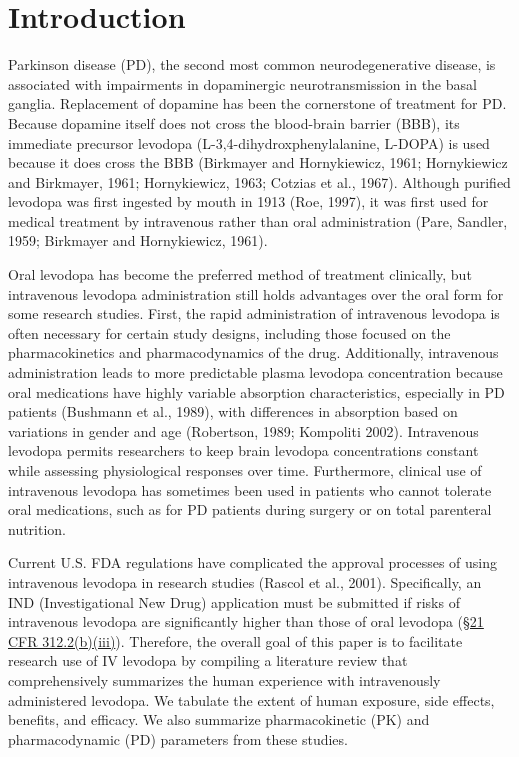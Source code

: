 \section{Introduction}
Parkinson disease (PD), the second most common neurodegenerative disease, is associated with impairments in dopaminergic neurotransmission in the basal ganglia. Replacement of dopamine has been the cornerstone of treatment for PD. Because dopamine itself does not cross the blood-brain barrier (BBB), its immediate precursor levodopa (L-3,4-dihydroxphenylalanine, L-DOPA) is used because it does cross the BBB (Birkmayer and Hornykiewicz, 1961; Hornykiewicz and Birkmayer, 1961; Hornykiewicz, 1963; Cotzias et al., 1967). Although purified levodopa was first ingested by mouth in 1913 (Roe, 1997), it was first used for medical treatment by intravenous rather than oral administration (Pare, Sandler, 1959; Birkmayer and Hornykiewicz, 1961).
	
Oral levodopa has become the preferred method of treatment clinically, but intravenous levodopa administration still holds advantages over the oral form for some research studies.  First, the rapid administration of intravenous levodopa is often necessary for certain study designs, including those focused on the pharmacokinetics and pharmacodynamics of the drug.  Additionally, intravenous administration leads to more predictable plasma levodopa concentration because oral medications have highly variable absorption characteristics, especially in PD patients (Bushmann et al., 1989), with differences in absorption based on variations in gender and age (Robertson, 1989; Kompoliti 2002).  Intravenous levodopa permits researchers to keep brain levodopa concentrations constant while assessing physiological responses over time.  Furthermore, clinical use of intravenous levodopa has sometimes been used in patients who cannot tolerate oral medications, such as for PD patients during surgery or on total parenteral nutrition.  

Current U.S. FDA regulations have complicated the approval processes of using intravenous levodopa in research studies (Rascol et al., 2001).  Specifically, an IND (Investigational New Drug) application must be submitted if risks of intravenous levodopa are significantly higher than those of oral levodopa (\href{http://www.accessdata.fda.gov/scripts/cdrh/cfdocs/cfcfr/CFRSearch.cfm?fr=312.2}{\S 21 CFR 312.2(b)(iii)}).  Therefore, the overall goal of this paper is to facilitate research use of IV levodopa by compiling a literature review that comprehensively summarizes the human experience with intravenously administered levodopa.  We tabulate the extent of human exposure, side effects, benefits, and efficacy.  We also summarize pharmacokinetic (PK) and pharmacodynamic (PD) parameters from these studies. 
